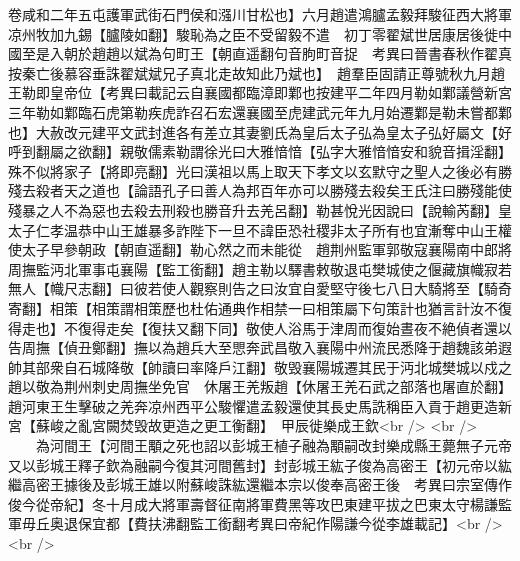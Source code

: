 卷咸和二年五屯護軍武街石門侯和漒川甘松也】六月趙遣鴻臚孟毅拜駿征西大將軍凉州牧加九錫【臚陵如翻】駿恥為之臣不受留毅不遣　初丁零翟斌世居康居後徙中國至是入朝於趙趙以斌為句町王【朝直遥翻句音胊町音捉　考異曰晉書春秋作翟真按秦亡後慕容垂誅翟斌斌兄子真北走故知此乃斌也】　趙羣臣固請正尊號秋九月趙王勒即皇帝位【考異曰載記云自襄國都臨漳即鄴也按建平二年四月勒如鄴議營新宮三年勒如鄴臨石虎第勒疾虎詐召石宏還襄國至虎建武元年九月始遷鄴是勒未嘗都鄴也】大赦改元建平文武封進各有差立其妻劉氏為皇后太子弘為皇太子弘好屬文【好呼到翻屬之欲翻】親敬儒素勒謂徐光曰大雅愔愔【弘字大雅愔愔安和貌音揖淫翻】殊不似將家子【將即亮翻】光曰漢祖以馬上取天下孝文以玄默守之聖人之後必有勝殘去殺者天之道也【論語孔子曰善人為邦百年亦可以勝殘去殺矣王氏注曰勝殘能使殘暴之人不為惡也去殺去刑殺也勝音升去羌呂翻】勒甚悅光因說曰【說輸芮翻】皇太子仁孝温恭中山王雄暴多詐陛下一旦不諱臣恐社稷非太子所有也宜漸奪中山王權使太子早參朝政【朝直遥翻】勒心然之而未能從　趙荆州監軍郭敬寇襄陽南中郎將周撫監沔北軍事屯襄陽【監工銜翻】趙主勒以驛書敕敬退屯樊城使之偃藏旗幟寂若無人【幟尺志翻】曰彼若使人觀察則告之曰汝宜自愛堅守後七八日大騎將至【騎奇寄翻】相策【相策謂相策歷也杜佑通典作相禁一曰相策屬下句策計也猶言計汝不復得走也】不復得走矣【復扶又翻下同】敬使人浴馬于津周而復始晝夜不絶偵者還以告周撫【偵丑鄭翻】撫以為趙兵大至愳奔武昌敬入襄陽中州流民悉降于趙魏該弟遐帥其部衆自石城降敬【帥讀曰率降戶江翻】敬毁襄陽城遷其民于沔北城樊城以戍之趙以敬為荆州刺史周撫坐免官　休屠王羌叛趙【休屠王羌石武之部落也屠直於翻】趙河東王生擊破之羌奔凉州西平公駿懼遣孟毅還使其長史馬詵稱臣入貢于趙更造新宮【蘇峻之亂宮闕焚毁故更造之更工衡翻】　甲辰徙樂成王欽<br />
<br />
　　為河間王【河間王顒之死也詔以彭城王植子融為顒嗣改封樂成縣王薨無子元帝又以彭城王釋子欽為融嗣今復其河間舊封】封彭城王紘子俊為高密王【初元帝以紘繼高密王據後及彭城王雄以附蘇峻誅紘還繼本宗以俊奉高密王後　考異曰宗室傳作俊今從帝紀】冬十月成大將軍壽督征南將軍費黑等攻巴東建平拔之巴東太守楊謙監軍毋丘奥退保宜都【費扶沸翻監工銜翻考異曰帝紀作陽謙今從李雄載記】<br />
<br />
